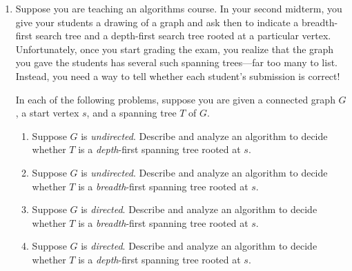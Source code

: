 \begin{exercises}
\begin{enumerate}[label=\arabic*.,ref=\thechapter.\arabic*,leftmargin=*,align=left,itemsep=1.5ex plus 0.5ex,start=0]
Your baby brother, who loves playing with shiny objects, has somehow managed to lock all your keys inside the boxes!
Luckily, your home security system recorded everything, so you know exactly which keys (if any) are inside each box.
You need to get all the keys back out of the boxes, because they are made of gold.
Clearly you have to smash at least one box.
\begin{enumerate}
\item Your baby brother has found the hammer and is eagerly eyeing one of the boxes.
Describe and analyze an algorithm to determine if it is possible to retrieve all the keys without smashing any box except the one your brother has chosen.
\item Describe and analyze an algorithm to compute the minimum number of boxes that must be smashed to retrieve all the keys.
\end{enumerate}

\item Suppose you are teaching an algorithms course.
In your second midterm, you give your students a drawing of a graph and ask then to indicate a breadth-first search tree and a depth-first search tree rooted at a particular vertex.
Unfortunately, once you start grading the exam, you realize that the graph you gave the students has several such spanning trees---far too many to list.
Instead, you need a way to tell whether each student’s submission is correct!

In each of the following problems, suppose you are given a connected graph $G$, a start vertex $s$, and a spanning tree $T$ of $G$.
\begin{enumerate}
\item Suppose $G$ is \textit{undirected}.
Describe and analyze an algorithm to decide whether $T$ is a \textit{depth}-first spanning tree rooted at $s$.
\item Suppose $G$ is \textit{undirected}.
Describe and analyze an algorithm to decide whether $T$ is a \textit{breadth}-first spanning tree rooted at $s$.
\item Suppose $G$ is \textit{directed}.
Describe and analyze an algorithm to decide whether $T$ is a \textit{breadth}-first spanning tree rooted at $s$.
\item Suppose $G$ is \textit{directed}.
Describe and analyze an algorithm to decide whether $T$ is a \textit{depth}-first spanning tree rooted at $s$.
\end{enumerate}


\end{enumerate}
\end{exercises}
